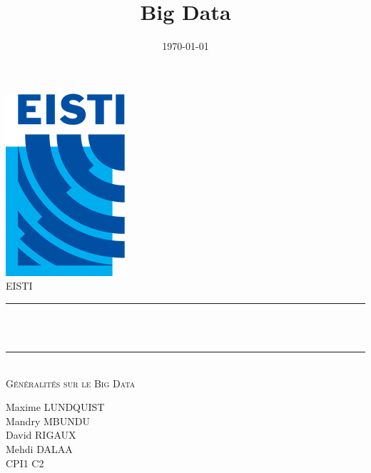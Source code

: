 \documentclass[12pt]{article}
\date{\displaydate{date}}
\title{Big Data}								%
\date{\today}											%
\makeatletter
\let\thetitle\@title
\makeatother
\begin{document}

\begin{titlepage}
	\centering
    \vspace*{0.5 cm}
    \includegraphics[scale = 0.75 ]{logo1}\\[1.0 cm]	%
    \textsc{\LARGE EISTI}\\[2.0 cm]			%
    \rule{\linewidth}{0.2 mm} \\[0.5 cm]
    { \huge \bfseries \thetitle}\\
    \rule{\linewidth}{0.2 mm} \\[1.5 cm]
	\textsc{\Large Généralités sur le Big Data}\\[0.5 cm]	%
	
	
	\begin{minipage}{0.4\textwidth}
	\centering
		\begin{center} \large
		Maxime LUNDQUIST \\
		Mandry MBUNDU \\
		David RIGAUX \\
		Mehdi DALAA \\
		\textsc{\large CPI1 C2}\\[0.5 cm]		%
			\end{center}
			\end{minipage}~
			\begin{minipage}{0.4\textwidth}
	\end{minipage}\\[0.8 cm]
	{\large {}}\\[1 cm]
	\vfill
	
\end{titlepage}

\end{document}

